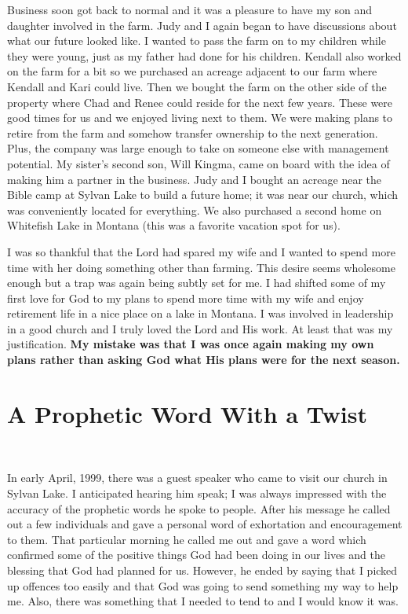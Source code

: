 \documentclass[oneside]{book}
\begin{document}
Business soon got back to normal and it was a pleasure to have my son and daughter involved  in the farm. Judy and I again began to have discussions about what our future looked like. I wanted to pass the farm on to my children while they were young, just as my father had done for his children. Kendall also worked on the farm for a bit so we purchased an acreage adjacent to our farm where Kendall and Kari could live. Then we bought the farm on the other side of the property where Chad and Renee could reside for the next few years. These were good times for us and we enjoyed living next to them. We were making plans to retire from the farm and somehow transfer ownership to the next generation. Plus, the company was large enough to take on someone else with management potential. My sister's second son, Will Kingma, came on board with the idea of making him a partner in the business. Judy and I bought an acreage near the Bible camp at Sylvan Lake to build a future home; it was near our church, which was conveniently located for everything. We also purchased a second home on Whitefish Lake in Montana (this was a favorite vacation spot for us).

I was so thankful that the Lord had spared my wife and I wanted to spend more time with her doing something other than farming. This desire seems wholesome enough but a trap was again being subtly set for me. I had shifted some of my first love for God to my plans to spend more time with my wife and enjoy retirement life in a nice place on a lake in Montana. I was involved in leadership in a good church and I truly loved the Lord and His work. At least that was my justification. \textbf{My mistake was that I was once again making my own plans rather than asking God what His plans were for the next season.}


\section{A Prophetic Word With a Twist}
\

In early April, 1999, there was a guest speaker who came to visit our church in Sylvan Lake. I anticipated hearing him speak; I was always impressed with the accuracy of the prophetic words he spoke to people. After his message he called out a few individuals and gave a personal word of exhortation and encouragement to them. That particular morning he called me out and gave a word which confirmed some of the positive things God had been doing in our lives and the blessing that God had planned for us. However, he ended by saying that I picked up offences too easily and that God was going to send something my way to help me. Also, there was something that I needed to tend to and I would know it was.
 
\end{document}
